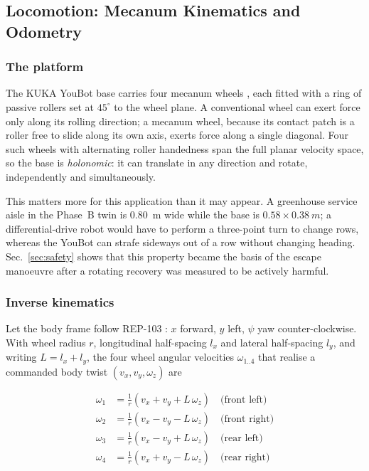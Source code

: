 \subsection{Locomotion: Mecanum Kinematics and Odometry}
\label{sec:phaseA_locomotion}

\subsubsection{The platform}

The KUKA YouBot base carries four mecanum wheels
\cite{ilon1975wheel}, each fitted with a ring of passive rollers set at
$45^\circ$ to the wheel plane. A conventional wheel can exert force only
along its rolling direction; a mecanum wheel, because its contact patch
is a roller free to slide along its own axis, exerts force along a
single diagonal. Four such wheels with alternating roller handedness
span the full planar velocity space, so the base is
\emph{holonomic}: it can translate in any direction and rotate,
independently and simultaneously.

This matters more for this application than it may appear. A greenhouse
service aisle in the Phase~B twin is \SI{0.80}{m} wide while the base is
$0.58 \times \SI{0.38}{m}$; a differential-drive robot would have to
perform a three-point turn to change rows, whereas the YouBot can
strafe sideways out of a row without changing heading. Sec.~\ref{sec:safety}
shows that this property became the basis of the escape manoeuvre after
a rotating recovery was measured to be actively harmful.

\subsubsection{Inverse kinematics}

Let the body frame follow REP-103 \cite{rep103}: $x$ forward, $y$ left,
$\psi$ yaw counter-clockwise. With wheel radius $r$, longitudinal
half-spacing $l_x$ and lateral half-spacing $l_y$, and writing
$L = l_x + l_y$, the four wheel angular velocities
$\omega_{1..4}$ that realise a commanded body twist
$(v_x, v_y, \omega_z)$ are

\begin{align}
\omega_1 &= \tfrac{1}{r}\left( v_x + v_y + L\,\omega_z \right)
            \quad \text{(front left)} \label{eq:mec1}\\
\omega_2 &= \tfrac{1}{r}\left( v_x - v_y - L\,\omega_z \right)
            \quad \text{(front right)} \label{eq:mec2}\\
\omega_3 &= \tfrac{1}{r}\left( v_x - v_y + L\,\omega_z \right)
            \quad \text{(rear left)} \label{eq:mec3}\\
\omega_4 &= \tfrac{1}{r}\left( v_x + v_y - L\,\omega_z \right)
            \quad \text{(rear right)} \label{eq:mec4}
\end{align}

